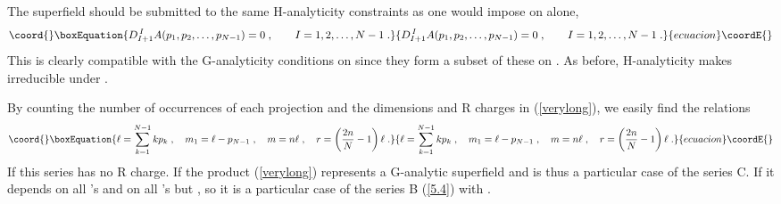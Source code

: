 \documentclass[a4paper,12pt]{article}
\begin{document}
The superfield \coordHE{} should be submitted to 
the same H-analyticity constraints as one would impose on 
\coordHE{} alone, 
\begin{equation}\coord{}\boxEquation{\label{alone}
  D^{\, I}_{I+1}A(p_1,p_2,\ldots,p_{N-1})=0\;, \qquad 
I=1,2,\ldots, N-1\;. 
}{D^{\, I}_{I+1}A(p_1,p_2,\ldots,p_{N-1})=0\;, \qquad 
I=1,2,\ldots, N-1\;. 
}{ecuacion}\coordE{}\end{equation}
This is clearly compatible with the G-analyticity conditions on 
\coordHE{} since they form a subset of these on 
\coordHE{}. As before, H-analyticity makes 
\coordHE{} irreducible under \coordHE{}. 

By counting the number of occurrences of each projection 
\coordHE{} and the dimensions and R charges in 
(\ref{verylong}), we easily find the relations 
\begin{equation}\coord{}\boxEquation{\label{m-l}
   \ell= \sum^{N-1}_{k=1}kp_k\;, \quad m_1= \ell-p_{N-1}\;, \quad m=n\ell\;,
\quad  r= \left({2n\over N}-1 \right)\ell\;. 
}{\ell= \sum^{N-1}_{k=1}kp_k\;, \quad m_1= \ell-p_{N-1}\;, \quad m=n\ell\;,
\quad  r= \left({2n\over N}-1 \right)\ell\;. 
}{ecuacion}\coordE{}\end{equation}
If \coordHE{} this series has no R charge. If \coordHE{} the product
(\ref{verylong}) represents a G-analytic superfield and is thus a 
particular case of the series C. If \coordHE{} it depends on 
all \myHighlight{$\theta$}\coordHE{}'s and on all \myHighlight{$\bar\theta$}\coordHE{}'s but \coordHE{}, so it 
is a particular case of the series  B (\ref{5.4}) with \coordHE{}. 
\end{document}
